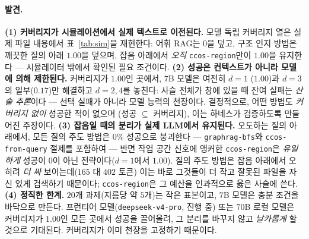 \documentclass[11pt]{article}
\newcommand{\code}[1]{\texttt{#1}}
\begin{document}
\paragraph{발견.}
\textbf{(1) 커버리지가 시뮬레이션에서 실제 텍스트로 이전된다.} 모델 독립 커버리지 열은 실제 파일 내용에서
표~\ref{tab:sim}을 재현한다: 어휘 RAG는 $0$을 덮고, 구조 인지 방법은 깨끗한 질의 아래 $1.00$을 덮으며, 잡음 아래에서
\emph{오직} \code{ccos-region}만이 $1.00$을 유지한다 --- 시뮬레이터 밖에서 확인된 필요 조건이다.
\textbf{(2) 성공은 컨텍스트가 아니라 모델에 의해 제한된다.} 커버리지가 $1.00$인 곳에서, $7$B 모델은 여전히 $d{=}1$
($1.00$)과 $d{=}3$의 일부($0.17$)만 해결하고 $d{=}2,4$를 놓친다: 사슬 전체가 창에 있을 때 잔여 실패는 \emph{산술
추론}이다 --- 선택 실패가 아니라 모델 능력의 천장이다. 결정적으로, 어떤 방법도 \emph{커버리지 없이} 성공한 적이 없으며
(성공 $\subseteq$ 커버리지), 이는 하네스가 검증하도록 만들어진 주장이다.
\textbf{(3) 잡음일 때의 분리가 실제 LLM에서 유지된다.} 오도하는 질의 아래에서, 모든 질의 주도 방법은 $0\%$ 성공으로
붕괴한다 --- \code{graphrag-bfs}와 \code{ccos-from-query} 절제를 포함하여 --- 반면 작업 공간 신호에 앵커한
\code{ccos-region}은 \emph{유일하게} 성공이 0이 아닌 전략이다($d{=}1$에서 $1.00$). 질의 주도 방법은 잡음 아래에서
오히려 \emph{더 싸} 보이는데($165$ 대 $402$ 토큰) 이는 바로 그것들이 더 작고 잘못된 파일을 자신 있게 검색하기
때문이다; \code{ccos-region}은 그 예산을 인과적으로 옳은 사슬에 쓴다.
\textbf{(4) 정직한 한계.} $20$개 과제(지름당 약 $5$개)는 작은 표본이고, $7$B 모델은 충분 조건을 바닥으로 만든다.
프런티어 모델(\code{deepseek-v4-pro}, 진행 중) 또는 $70$B 로컬 모델은 커버리지가 $1.00$인 모든 곳에서 성공을
끌어올려, 그 분리를 바꾸지 않고 \emph{날카롭게} 할 것으로 기대된다. 커버리지가 이미 천장을 고정하기 때문이다.
\end{document}
